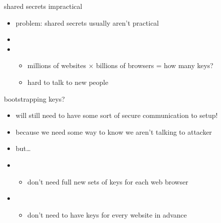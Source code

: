 \begin{frame}[fragile,label=sharedSecretProblem]{shared secrets impractical}
    \begin{itemize}
    \item problem: shared secrets usually aren't practical
    \vspace{.5cm}
    \item {}
    \item {}
        \begin{itemize}
        \item millions of websites $\times$ billions of browsers = how many keys?
        \item hard to talk to new people
        \end{itemize}
    \end{itemize}
\end{frame}

\begin{frame}{bootstrapping keys?}
    \begin{itemize}
    \item will still need to have some sort of secure communication to setup!
    \item because we need some way to know we aren't talking to attacker
    \item<2-> but\ldots
    \vspace{.5cm}
    \item<3-> 
        \begin{itemize}
        \item don't need full new sets of keys for each web browser
        \end{itemize}
    \item<4-> 
        \begin{itemize}
        \item don't need to have keys for every website in advance
        \end{itemize}
    \end{itemize}
\end{frame}
